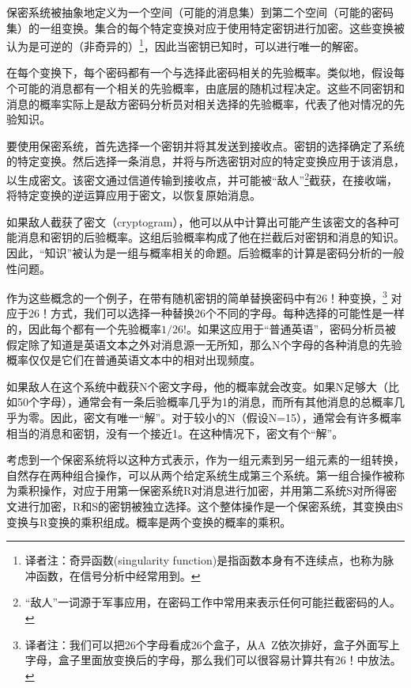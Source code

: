 \documentclass[]{article}
\begin{document}
保密系统被抽象地定义为一个空间（可能的消息集）到第二个空间（可能的密码集）的一组变换。集合的每个特定变换对应于使用特定密钥进行加密。这些变换被认为是可逆的（非奇异的）\footnote{译者注：奇异函数(singularity function)是指函数本身有不连续点，也称为脉冲函数，在信号分析中经常用到。}，因此当密钥已知时，可以进行唯一的解密。\par

在每个变换下，每个密码都有一个与选择此密码相关的先验概率。类似地，假设每个可能的消息都有一个相关的先验概率，由底层的随机过程决定。这些不同密钥和消息的概率实际上是敌方密码分析员对相关选择的先验概率，代表了他对情况的先验知识。\par

要使用保密系统，首先选择一个密钥并将其发送到接收点。密钥的选择确定了系统的特定变换。然后选择一条消息，并将与所选密钥对应的特定变换应用于该消息，以生成密文。该密文通过信道传输到接收点，并可能被“敌人”\footnote{“敌人”一词源于军事应用，在密码工作中常用来表示任何可能拦截密码的人。}截获，在接收端，将特定变换的逆运算应用于密文，以恢复原始消息。\par

如果敌人截获了密文（cryptogram），他可以从中计算出可能产生该密文的各种可能消息和密钥的后验概率。这组后验概率构成了他在拦截后对密钥和消息的知识。因此，“知识”被认为是一组与概率相关的命题。后验概率的计算是密码分析的一般性问题。
\par

作为这些概念的一个例子，在带有随机密钥的简单替换密码中有26！种变换，\footnote{译者注：我们可以把26个字母看成26个盒子，从A~Z依次排好，盒子外面写上字母，盒子里面放变换后的字母，那么我们可以很容易计算共有26！中放法。}
对应于26！方式，我们可以选择一种替换26个不同的字母。每种选择的可能性是一样的，因此每个都有一个先验概率$1/26!$。如果这应用于“普通英语”，密码分析员被假定除了知道是英语文本之外对消息源一无所知，那么N个字母的各种消息的先验概率仅仅是它们在普通英语文本中的相对出现频度。\par

如果敌人在这个系统中截获N个密文字母，他的概率就会改变。如果N足够大（比如50个字母），通常会有一条后验概率几乎为1的消息，而所有其他消息的总概率几乎为零。因此，密文有唯一“解”。对于较小的N（假设N=15），通常会有许多概率相当的消息和密钥，没有一个接近1。在这种情况下，密文有个“解”。\par

考虑到一个保密系统将以这种方式表示，作为一组元素到另一组元素的一组转换，自然存在两种组合操作，可以从两个给定系统生成第三个系统。第一组合操作被称为乘积操作，对应于用第一保密系统R对消息进行加密，并用第二系统S对所得密文进行加密，R和S的密钥被独立选择。这个整体操作是一个保密系统，其变换由S变换与R变换的乘积组成。概率是两个变换的概率的乘积。\par
\end{document}
